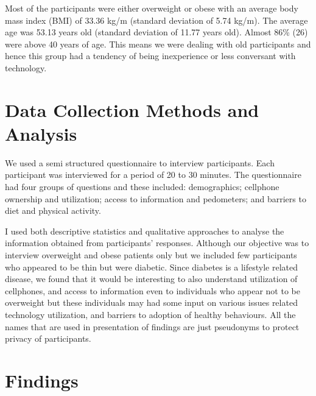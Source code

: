 Most of the participants were either overweight or obese with an average body mass index (BMI) of 33.36 kg/m (standard deviation of 5.74 kg/m). The average age was 53.13 years old (standard deviation of 11.77 years old).  Almost 86\% (26) were above 40 years of age. This means we were dealing with old participants and hence this group had a tendency of being inexperience or less conversant with technology.

\section{Data Collection Methods and Analysis}
We used a semi structured questionnaire to interview participants. Each participant was interviewed for a period of 20 to 30 minutes. The questionnaire had four groups of questions and these included: demographics; cellphone ownership and utilization; access to information and pedometers; and barriers to diet and physical activity. 

I used both descriptive statistics and qualitative approaches to analyse the information obtained from participants’ responses. Although our objective was to interview overweight and obese patients only but we included few participants who appeared to be thin but were diabetic. Since diabetes is a lifestyle related disease, we found that it would be interesting to also understand utilization of cellphones, and access to information even to individuals who appear not to be overweight but these individuals may had some input on various issues related technology utilization, and  barriers to adoption of healthy behaviours. All the names that are used in presentation of findings are just pseudonyms to protect privacy of participants. 
\section{Findings}
